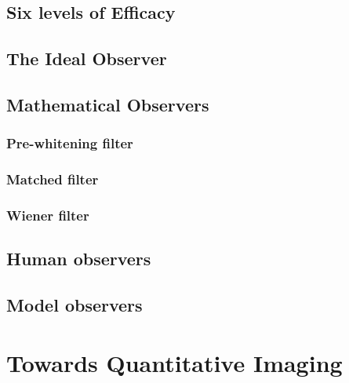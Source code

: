 \documentclass[11pt]{article}
\begin{document}
\subsection{Six levels of Efficacy}
\subsection{The Ideal Observer}
\subsection{Mathematical Observers}
\subsubsection{Pre-whitening filter}
\subsubsection{Matched filter}
\subsubsection{Wiener filter}
\subsection{Human observers}
\subsection{Model observers}

\newpage
\section{Towards Quantitative Imaging}
\end{document}
